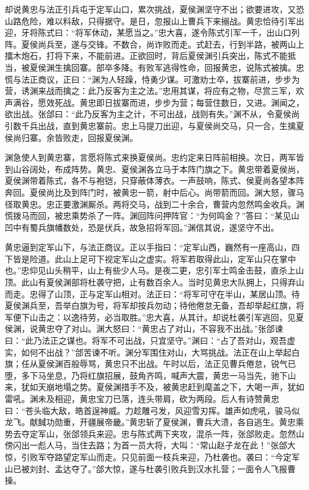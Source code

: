 却说黄忠与法正引兵屯于定军山口，累次挑战，夏侯渊坚守不出；欲要进攻，又恐山路危险，难以料敌，只得据守。是日，忽报山上曹兵下来搦战。黄忠恰待引军出迎，牙将陈式曰：“将军休动，某愿当之。”忠大喜，遂令陈式引军一千，出山口列阵。夏侯尚兵至，遂与交锋。不数合，尚诈败而走。式赶去，行到半路，被两山上擂木炮石，打将下来，不能前进。正欲回时，背后夏侯渊引兵突出，陈式不能抵当，被夏侯渊生擒回寨。部卒多降。有败军逃得性命，回报黄忠，说陈式被擒。忠慌与法正商议，正曰：“渊为人轻躁，恃勇少谋。可激劝士卒，拔寨前进，步步为营，诱渊来战而擒之：此乃反客为主之法。”忠用其谋，将应有之物，尽赏三军，欢声满谷，愿效死战。黄忠即日拔寨而进，步步为营；每营住数日，又进。渊闻之，欲出战。张郃曰：“此乃反客为主之计，不可出战，战则有失。”渊不从，令夏侯尚引数千兵出战，直到黄忠寨前。忠上马提刀出迎，与夏侯尚交马，只一合，生擒夏侯尚归寨。余皆败走，回报夏侯渊。

渊急使人到黄忠寨，言愿将陈式来换夏侯尚。忠约定来日阵前相换。次日，两军皆到山谷阔处，布成阵势。黄忠、夏侯渊各立马于本阵门旗之下。黄忠带着夏侯尚，夏侯渊带着陈式，各不与袍铠，只穿蔽体薄衣。一声鼓响，陈式、侯夏尚各望本阵奔回。夏侯尚比及到阵门时，被黄忠一箭，射中后心。尚带箭而回。渊大怒，骤马径取黄忠。忠正要激渊厮杀。两将交马，战到二十余合，曹营内忽然鸣金收兵。渊慌拨马而回，被忠乘势杀了一阵。渊回阵问押阵官：“为何鸣金？”答曰：“某见山凹中有蜀兵旗幡数处，恐是伏兵，故急招将军回。”渊信其说，遂坚守不出。

黄忠逼到定军山下，与法正商议。正以手指曰：“定军山西，巍然有一座高山，四下皆是险道。此山上足可下视定军山之虚实。将军若取得此山，定军山只在掌中也。”忠仰见山头稍平，山上有些少人马。是夜二更，忠引军士鸣金击鼓，直杀上山顶。此山有夏侯渊部将杜袭守把，止有数百余人。当时见黄忠大队拥上，只得弃山而走。忠得了山顶，正与定军山相对。法正曰：“将军可守在半山，某居山顶。待夏侯渊兵至，吾举白旗为号，将军却按兵勿动；待他倦怠无备，吾却举起红旗，将军便下山击之：以逸待劳，必当取胜。”忠大喜，从其计。却说杜袭引军逃回，见夏侯渊，说黄忠夺了对山。渊大怒曰：“黄忠占了对山，不容我不出战。”张郃谏曰：“此乃法正之谋也。将军不可出战，只宜坚守。”渊曰：“占了吾对山，观吾虚实，如何不出战？”郃苦谏不听。渊分军围住对山，大骂挑战。法正在山上举起白旗；任从夏侯渊百般辱骂，黄忠只不出战。午时以后，法正见曹兵倦怠，锐气已堕，多下马坐息，乃将红旗招展，鼓角齐鸣，喊声大震，黄忠一马当先，驰下山来，犹如天崩地塌之势。夏侯渊措手不及，被黄忠赶到麾盖之下，大喝一声，犹如雷吼。渊未及相迎，黄忠宝刀已落，连头带肩，砍为两段。后人有诗赞黄忠曰：“苍头临大敌，皓首逞神威。力趁雕弓发，风迎雪刃挥。雄声如虎吼，骏马似龙飞。献馘功勋重，开疆展帝畿。”黄忠斩了夏侯渊，曹兵大溃，各自逃生。黄忠乘势去夺定军山，张郃领兵来迎。忠与陈式两下夹攻，混杀一阵，张郃败走。忽然山傍闪出一彪人马，当住去路；为首一员大将，大叫：“常山赵子龙在此！”张郃大惊，引败军夺路望定军山而走。只见前面一枝兵来迎，乃杜袭也。袭曰：“今定军山已被刘封、孟达夺了。”郃大惊，遂与杜袭引败兵到汉水扎营；一面令人飞报曹操。

